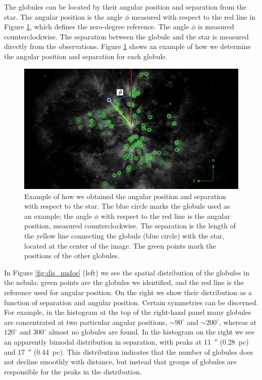 \documentclass{book}
\begin{document}
The globules can be located by their angular position and separation
from the star. The angular position is the angle $\phi$ measured with
respect to the red line in Figure \ref{fig:ejemplo_PA_Sep}, which
defines the zero-degree reference. The angle $\phi$ is measured
counterclockwise. The separation between the globule and the star is
measured directly from the observations. Figure
\ref{fig:ejemplo_PA_Sep} shows an example of how we determine the
angular position and separation for each globule.

\begin{figure}[htb]
    \centering
    \includegraphics[width=\textwidth]{ultimas correcciones/M167_PA.pdf}
    \caption{Example of how we obtained the angular position and
      separation with respect to the star. The blue circle marks the
      globule used as an example; the angle $\phi$ with respect to the
      red line is the angular position, measured counterclockwise. The
      separation is the length of the yellow line connecting the
      globule (blue circle) with the star, located at the center of
      the image. The green points mark the positions of the other
      globules.}
    \label{fig:ejemplo_PA_Sep}
\end{figure}

In Figure \ref{fig:dis_nudos} (left) we see the spatial distribution
of the globules in the nebula: green points are the globules we
identified, and the red line is the reference used for angular
position. On the right we show their distribution as a function of
separation and angular position. Certain symmetries can be discerned.
For example, in the histogram at the top of the right-hand panel many
globules are concentrated at two particular angular positions,
$\sim90^\circ$ and $\sim200^\circ$, whereas at $120^\circ$ and
$300^\circ$ almost no globules are found. In the histogram on the
right we see an apparently bimodal distribution in separation, with
peaks at \SI{11}{\arcsecond} (\SI{.28}{pc}) and \SI{17}{\arcsecond}
(\SI{.44}{pc}). This distribution indicates that the number of
globules does not decline smoothly with distance, but instead that
groups of globules are responsible for the peaks in the distribution.
\end{document}
